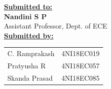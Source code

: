 \documentclass[a4paper,12pt]{report}
\begin{document}
\begin{titlepage}
\begin{center}
        \vspace{1cm}
        \textbf{\underline{\large Submitted to:}} \\
        \textbf{\large Nandini S P} \\
        Assistant Professor, Dept. of ECE \\
        \vspace{1cm}
        \textbf{\underline{\large Submitted by:}} \\
        \vspace{0.5cm}
        \begin{tabular}[H]{l l}
            C. Ramprakash & 4NI18EC019 \\
            Pratyusha R & 4NI18EC057 \\
            Skanda Prasad & 4NI18EC085 \\
        \end{tabular}
    \end{center}
\end{titlepage}
\clearpage
\restoregeometry

\tableofcontents
\newpage

\listoffigures
\listoftables
\listoflistings
\newpage






\printbibliography
\end{document}
